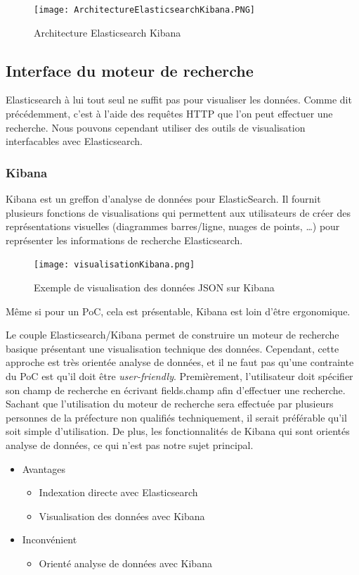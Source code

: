 \begin{figure}[h!]
  \centering
  \texttt{[image: ArchitectureElasticsearchKibana.PNG]}
	\caption[]{Architecture Elasticsearch Kibana}
	\label{}
\end{figure}



\subsection{Interface du moteur de recherche}
Elasticsearch à lui tout seul ne suffit pas pour visualiser les données.
Comme dit précédemment, c’est à l’aide des requêtes HTTP que l’on peut effectuer une recherche.
Nous pouvons cependant utiliser des outils de visualisation interfacables avec Elasticsearch.

\subsubsection{Kibana}
Kibana est un greffon d'analyse de données pour ElasticSearch.
Il fournit plusieurs fonctions de visualisations qui permettent aux utilisateurs de créer des représentations visuelles (diagrammes barres/ligne, nuages de points, \ldots) pour représenter les informations de recherche Elasticsearch.

\begin{figure}[h!]
  \centering
  \texttt{[image: visualisationKibana.png]}
	\caption[]{Exemple de visualisation des données JSON sur Kibana}
	\label{}
\end{figure}
Même si pour un PoC, cela est présentable, Kibana est loin d’être ergonomique.

Le couple Elasticsearch/Kibana permet de construire un moteur de recherche basique présentant une visualisation technique des données.
Cependant, cette approche est très orientée analyse de données, et il ne faut pas qu'une contrainte du PoC est qu'il doit être \textit{user-friendly}.
Premièrement, l’utilisateur doit spécifier son champ de recherche en écrivant fields.champ afin d’effectuer une recherche.
Sachant que l’utilisation du moteur de recherche sera effectuée par plusieurs personnes de la préfecture non qualifiés techniquement, il serait préférable qu'il soit simple d’utilisation.
De plus, les fonctionnalités de Kibana qui sont orientés analyse de données, ce qui n'est pas notre sujet principal.

\begin{itemize}
    \item Avantages 
        \begin{itemize}
            \item Indexation directe avec Elasticsearch
            \item Visualisation des données avec Kibana
        \end{itemize}
    \item Inconvénient 
        \begin{itemize}
        \item Orienté analyse de données avec Kibana
        \end{itemize}
\end{itemize}


